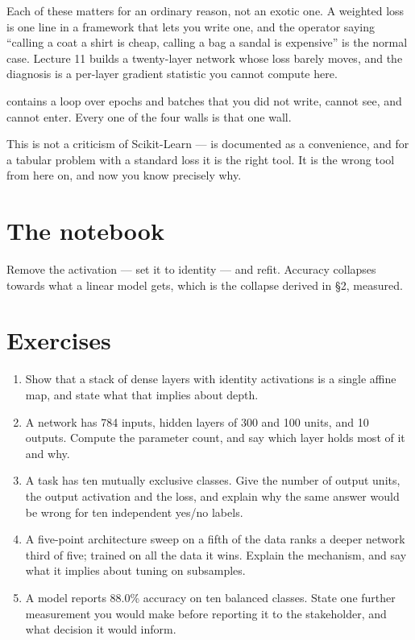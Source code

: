 \documentclass[11pt,a4paper]{article}
\begin{document}
Each of these matters for an ordinary reason, not an exotic one. A weighted
loss is one line in a framework that lets you write one, and the operator
saying ``calling a coat a shirt is cheap, calling a bag a sandal is expensive''
is the normal case. Lecture 11 builds a twenty-layer network whose loss barely
moves, and the diagnosis is a per-layer gradient statistic you cannot compute
here.

\begin{failbox}[title={Failure condition --- the problem underneath all four}]
 contains a  loop over epochs and batches that you did
not write, cannot see, and cannot enter. Every one of the four walls is that
one wall.

This is not a criticism of Scikit-Learn ---  is documented
as a convenience, and for a tabular problem with a standard loss it is the
right tool. It is the wrong tool from here on, and now you know precisely why.
\end{failbox}

\section{The notebook}

\begin{trybox}[title={What to change}]
Remove the activation --- set it to identity --- and refit. Accuracy collapses
towards what a linear model gets, which is the collapse derived in \S2,
measured.
\end{trybox}

\section{Exercises}

\begin{enumerate}[leftmargin=1.6em,itemsep=4pt]
  \item Show that a stack of dense layers with identity activations is a single
        affine map, and state what that implies about depth. \hfill \scope{[5]}
  \item A network has 784 inputs, hidden layers of 300 and 100 units, and 10
        outputs. Compute the parameter count, and say which layer holds most of
        it and why. \hfill \scope{[4]}
  \item A task has ten mutually exclusive classes. Give the number of output
        units, the output activation and the loss, and explain why the same
        answer would be wrong for ten independent yes/no labels.
        \hfill \scope{[4]}
  \item A five-point architecture sweep on a fifth of the data ranks a deeper
        network third of five; trained on all the data it wins. Explain the
        mechanism, and say what it implies about tuning on subsamples.
        \hfill \scope{[5]}
  \item A model reports 88.0\% accuracy on ten balanced classes. State one
        further measurement you would make before reporting it to the
        stakeholder, and what decision it would inform. \hfill \scope{[4]}
\end{enumerate}
\end{document}
